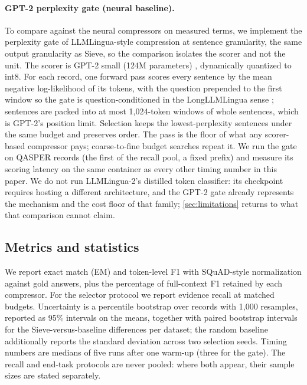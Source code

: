 \documentclass[pdflatex,sn-basic]{sn-jnl}
\theoremstyle{remark}
\newcommand{\method}{Sieve}
\begin{document}
\paragraph{GPT-2 perplexity gate (neural baseline).}
To compare against the neural compressors on measured terms, we
implement the perplexity gate of LLMLingua-style compression
\citep{jiang2023llmlingua} at sentence granularity, the same output
granularity as \method{}, so the comparison isolates the scorer and
not the unit. The scorer is GPT-2 small (124M parameters)
\citep{radford2019gpt2}, dynamically quantized to int8. For each
record, one forward pass scores every sentence by the mean negative
log-likelihood of its tokens, with the question prepended to the
first window so the gate is question-conditioned in the LongLLMLingua
sense \citep{jiang2023longllmlingua}; sentences are packed into at
most 1{,}024-token windows of whole sentences, which is GPT-2's
position limit. Selection keeps the lowest-perplexity sentences under
the same budget and preserves order. The pass is the floor of what
any scorer-based compressor pays; coarse-to-fine budget searches
repeat it. We run the gate on \GateN{} QASPER records (the first
\GateN{} of the recall pool, a fixed prefix) and measure its scoring
latency on the same container as every other timing number in this
paper. We do not run LLMLingua-2's distilled token classifier: its
checkpoint requires hosting a different architecture, and the GPT-2
gate already represents the mechanism and the cost floor of that
family; \autoref{sec:limitations} returns to what that comparison
cannot claim.

\subsection{Metrics and statistics}
We report exact match (EM) and token-level F1 with SQuAD-style
normalization \citep{yang2018hotpotqa} against gold answers, plus the
percentage of full-context F1 retained by each compressor. For the
selector protocol we report evidence recall at matched budgets.
Uncertainty is a percentile bootstrap over records with 1{,}000
resamples, reported as 95\% intervals on the means, together with
paired bootstrap intervals for the \method{}-versus-baseline
differences per dataset; the random baseline additionally reports the
standard deviation across two selection seeds. Timing numbers are
medians of five runs after one warm-up (three for the gate). The
recall and end-task protocols are never pooled: where both appear,
their sample sizes are stated separately.
\end{document}
